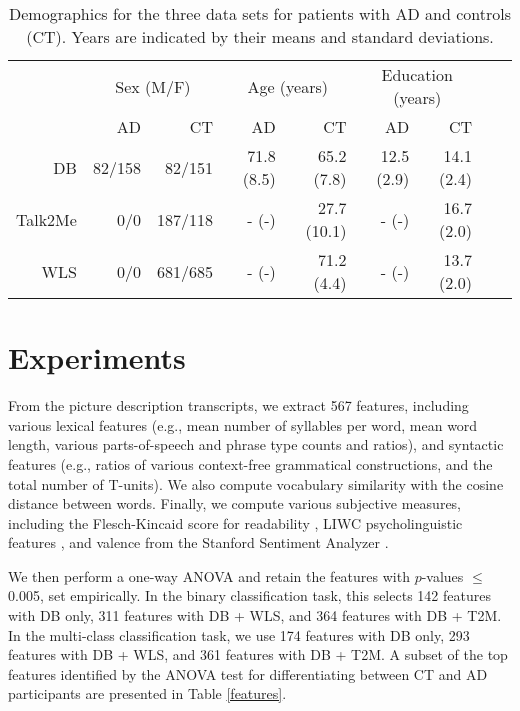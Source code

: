 \documentclass{article}
\newcommand{\talktome}{Talk2Me}
\begin{document}
\begin{table}[h]
\caption{\label{tab:demog} Demographics for the three data sets for patients with AD and controls (CT). Years are indicated by their means and standard deviations. }
\centering
\begin{tabular}{|r| rr | rr | rr | rr}
\hline
& \multicolumn{2}{|c|}{Sex (M/F)} & \multicolumn{2}{|c|}{Age (years)} & \multicolumn{2}{|c|}{Education (years)}\\
& AD & CT & AD & CT & AD & CT\\
\hline
DB & 82/158 & 82/151 & 71.8 (8.5) & 65.2 (7.8) & 12.5 (2.9) & 14.1 (2.4)\\
\talktome & 0/0 & 187/118 & - (-) & 27.7 (10.1) & - (-) & 16.7 (2.0) \\
WLS & 0/0 & 681/685 & - (-) & 71.2 (4.4) & - (-) & 13.7 (2.0) \\    %
\hline
\end{tabular}

\end{table}



\section{Experiments}\label{experiments}

From the picture description transcripts, we extract 567 features, including various lexical features (e.g., mean number of syllables per word,  mean word length, various parts-of-speech and phrase type counts and ratios), and syntactic features (e.g., ratios of various context-free grammatical constructions, and the total number of T-units). We also compute vocabulary similarity with the cosine distance between words. Finally, we compute various subjective measures, including the Flesch-Kincaid score for readability \cite{Kincaid1975}, LIWC psycholinguistic features \cite{Pennebaker2015}, and valence from the Stanford Sentiment Analyzer \cite{Socher2013}.

We then perform a one-way ANOVA and retain the features with $p$-values $\leq$ 0.005, set empirically. In the binary classification task, this selects 142 features with DB only, 311 features with DB + WLS, and 364 features with DB + T2M. In the multi-class classification task, we use 174 features with DB only, 293 features with DB + WLS, and 361 features with DB + T2M. A subset of the top features identified by the ANOVA test for differentiating between CT and AD participants are presented in Table \ref{features}.
\end{document}

